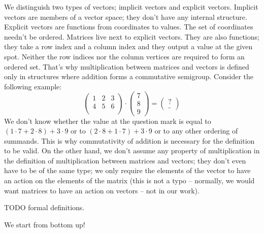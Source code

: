 \documentclass[]{article}
\renewcommand{\.}{\hskip .75pt}
\let\*=\cdot
\begin{document}
We distinguish two types of vectors; implicit vectors and explicit vectors.
Implicit vectors are members of a vector space; they don't have any internal structure.
Explicit vectors are functions from coordinates to values.
The set of coordinates needn't be ordered.
Matrices live next to explicit vectors. They are also functions; they take a row index
and a column index and they output a value at the given spot.
Neither the row indices nor the column vertices are required to form an ordered set.
That's why multiplication between matrices and vectors is defined only in structures
where addition forms a commutative semigroup. Consider the following example:
$$
\begin{pmatrix}
	1 & 2 & 3 \\
	4 & 5 & 6 \\
\end{pmatrix}
\*
\begin{pmatrix}
	7 \\ 8 \\ 9
\end{pmatrix}
=
\begin{pmatrix}
	? \\ \_
\end{pmatrix}
$$
We don't know whether the value at the question mark is equal to
$ (1 \* 7 + 2 \* 8) + 3 \* 9 $ or to
$ (2 \* 8 + 1 \* 7) + 3 \* 9 $ or to
any other ordering of summands.
This is why commutativity of addition is necessary for the definition to be valid.
On the other hand, we don't assume any property of multiplication in the
definition of multiplication between matrices and vectors; they don't even
have to be of the same type; we only require the elements of the vector
to have an action on the elements of the matrix (this is not a typo -- normally,
we would want matrices to have an action on vectors -- not in our work).

TODO formal definitions.

We start from bottom up!
\end{document}
